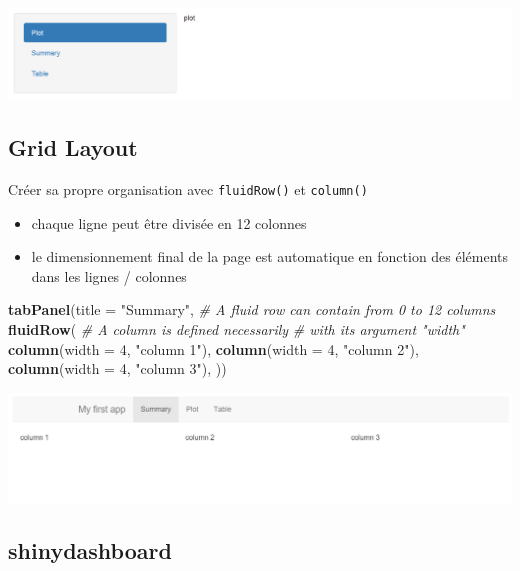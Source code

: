 \documentclass[]{article}
\newenvironment{Shaded}{\begin{snugshade}}{\end{snugshade}}
\newcommand{\KeywordTok}[1]{\textcolor[rgb]{0.13,0.29,0.53}{\textbf{#1}}}
\newcommand{\DataTypeTok}[1]{\textcolor[rgb]{0.13,0.29,0.53}{#1}}
\newcommand{\DecValTok}[1]{\textcolor[rgb]{0.00,0.00,0.81}{#1}}
\newcommand{\StringTok}[1]{\textcolor[rgb]{0.31,0.60,0.02}{#1}}
\newcommand{\CommentTok}[1]{\textcolor[rgb]{0.56,0.35,0.01}{\textit{#1}}}
\newcommand{\NormalTok}[1]{#1}
\providecommand{\tightlist}{%
  \setlength{\itemsep}{0pt}\setlength{\parskip}{0pt}}
\begin{document}
\includegraphics{img/navList.png}

\subsection{Grid Layout}\label{grid-layout}

Créer sa propre organisation avec \texttt{fluidRow()} et
\texttt{column()}

\begin{itemize}
\tightlist
\item
  chaque ligne peut être divisée en 12 colonnes
\item
  le dimensionnement final de la page est automatique en fonction des
  éléments dans les lignes / colonnes
\end{itemize}

\begin{Shaded}
\begin{Highlighting}[]
\KeywordTok{tabPanel}\NormalTok{(}\DataTypeTok{title =} \StringTok{"Summary"}\NormalTok{,}
         \CommentTok{# A fluid row can contain from 0 to 12 columns}
         \KeywordTok{fluidRow}\NormalTok{(}
           \CommentTok{# A column is defined necessarily}
           \CommentTok{# with its argument "width"}
           \KeywordTok{column}\NormalTok{(}\DataTypeTok{width =} \DecValTok{4}\NormalTok{, }\StringTok{"column 1"}\NormalTok{),}
           \KeywordTok{column}\NormalTok{(}\DataTypeTok{width =} \DecValTok{4}\NormalTok{, }\StringTok{"column 2"}\NormalTok{),}
           \KeywordTok{column}\NormalTok{(}\DataTypeTok{width =} \DecValTok{4}\NormalTok{, }\StringTok{"column 3"}\NormalTok{),}
\NormalTok{         ))}
\end{Highlighting}
\end{Shaded}

\includegraphics{img/grid.png}

\subsection{shinydashboard}\label{shinydashboard}
\end{document}

